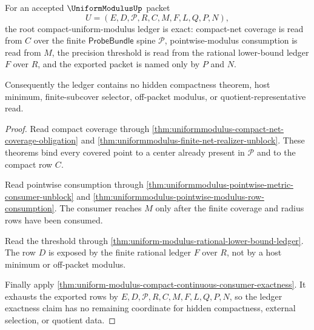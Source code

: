 \begin{theorem}
\label{thm:uniformmodulus-root-ledger-exactness-row}
For an accepted $\UniformModulusUp$ packet
$$
U=(E,D,\mathcal{P},R,C,M,F,L,Q,P,N),
$$
the root compact-uniform-modulus ledger is exact: compact-net coverage is read from $C$ over the finite $\mathsf{ProbeBundle}$ spine $\mathcal{P}$, pointwise-modulus consumption is read from $M$, the precision threshold is read from the rational lower-bound ledger $F$ over $R$, and the exported packet is named only by $P$ and $N$.

Consequently the ledger contains no hidden compactness theorem, host minimum, finite-subcover selector, off-packet modulus, or quotient-representative read.
\end{theorem}
\begin{proof}
Read compact coverage through \autoref{thm:uniformmodulus-compact-net-coverage-obligation} and \autoref{thm:uniformmodulus-finite-net-realizer-unblock}. These theorems bind every covered point to a center already present in $\mathcal{P}$ and to the compact row $C$.

Read pointwise consumption through \autoref{thm:uniformmodulus-pointwise-metric-consumer-unblock} and \autoref{thm:uniformmodulus-pointwise-modulus-row-consumption}. The consumer reaches $M$ only after the finite coverage and radius rows have been consumed.

Read the threshold through \autoref{thm:uniform-modulus-rational-lower-bound-ledger}. The row $D$ is exposed by the finite rational ledger $F$ over $R$, not by a host minimum or off-packet modulus.

Finally apply \autoref{thm:uniform-modulus-compact-continuous-consumer-exactness}. It exhausts the exported rows by $E,D,\mathcal{P},R,C,M,F,L,Q,P,N$, so the ledger exactness claim has no remaining coordinate for hidden compactness, external selection, or quotient data.
\end{proof}
